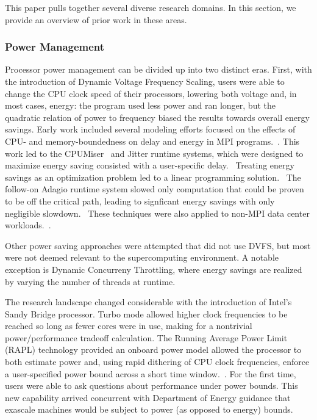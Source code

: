 This paper pulls together several diverse research domains.  In this section,
we provide an overview of prior work in these areas.

\subsubsection{Power Management}
Processor power management can be divided up into two distinct eras.  First, with 
the introduction of Dynamic Voltage Frequency Scaling, users were able to 
change the CPU clock speed of their processors, lowering both voltage and,
in most cases, energy:  the program used less power and ran longer, but the
quadratic relation of power to frequency biased the results towards overall
energy savings.  Early work included several modeling efforts focused on
the effects of CPU- and memory-boundedness on delay and energy in MPI programs.~\cite{SpringerPPoPP2006,GeICPP2007,LiHPCA2006,CameronSC2005,HsuSC2005}. 
This work led to the CPUMiser~\cite{GeICPP2007} and Jitter runtime systems, which were designed 
to maximize energy saving consisted with a user-specific delay.~\cite{KappiahSC2005}
Treating energy savings as an optimization problem led to a linear programming
solution.~\cite{rountree:07} The follow-on Adagio runtime system slowed only
computation that could be proven to be off the critical path, leading to signficant
energy savings with only negligible slowdown.~\cite{rountree:09} These 
techniques were also applied to non-MPI data center workloads.~\cite{femal:04}. 

Other power saving approaches were attempted that did not use DVFS, but most
were not deemed relevant to the supercomputing environment.  A notable exception
is Dynamic Concurreny Throttling, where energy savings are realized by varying
the number of threads at runtime.~\cite{Curtis1,Curtis2,Curtis3} 

The research landscape changed considerable with the introduction of Intel's
Sandy Bridge processor.  Turbo mode allowed higher clock frequencies to be
reached so long as fewer cores were in use, making for a nontrivial power/performance tradeoff
calculation.  The Running Average Power Limit (RAPL) technology provided an onboard power model allowed the processor to both
estimate power and, using rapid dithering of CPU clock frequencies, enforce a
user-specified power bound across a short time window.~\cite{IntelSDM,David2010}. 
For the first time, users were able to ask questions about performance under 
power bounds.  This new capability arrived concurrent with Department of Energy
guidance that exascale machines would be subject to power (as opposed to energy) bounds.

